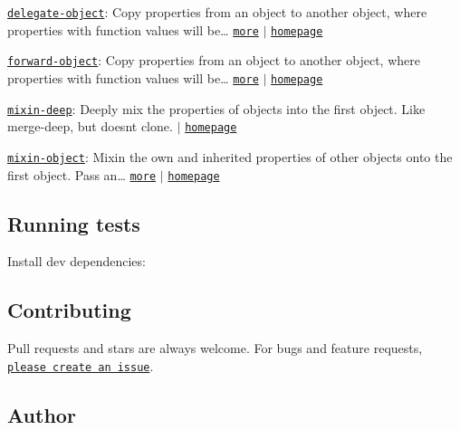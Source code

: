 \begin{DoxyItemize}
\item \href{https://www.npmjs.com/package/delegate-object}{\tt delegate-\/object}\+: Copy properties from an object to another object, where properties with function values will be… \href{https://www.npmjs.com/package/delegate-object}{\tt more} $\vert$ \href{https://github.com/doowb/delegate-object}{\tt homepage}
\item \href{https://www.npmjs.com/package/forward-object}{\tt forward-\/object}\+: Copy properties from an object to another object, where properties with function values will be… \href{https://www.npmjs.com/package/forward-object}{\tt more} $\vert$ \href{https://github.com/doowb/forward-object}{\tt homepage}
\item \href{https://www.npmjs.com/package/mixin-deep}{\tt mixin-\/deep}\+: Deeply mix the properties of objects into the first object. Like merge-\/deep, but doesn\textquotesingle{}t clone. $\vert$ \href{https://github.com/jonschlinkert/mixin-deep}{\tt homepage}
\item \href{https://www.npmjs.com/package/mixin-object}{\tt mixin-\/object}\+: Mixin the own and inherited properties of other objects onto the first object. Pass an… \href{https://www.npmjs.com/package/mixin-object}{\tt more} $\vert$ \href{https://github.com/jonschlinkert/mixin-object}{\tt homepage}
\end{DoxyItemize}

\subsection*{Running tests}

Install dev dependencies\+:




\subsection*{Contributing}

Pull requests and stars are always welcome. For bugs and feature requests, \href{https://github.com/jonschlinkert/define-property/issues/new}{\tt please create an issue}.

\subsection*{Author}

